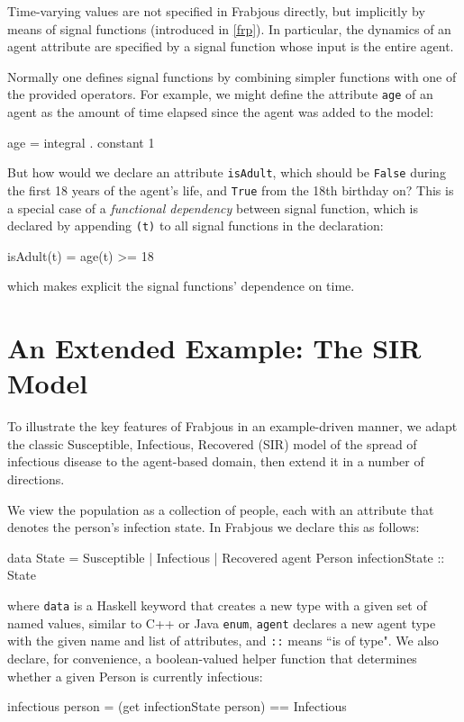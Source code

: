 \documentclass[oribibl]{llncs}
\begin{document}
Time-varying values are not specified in Frabjous directly, but implicitly by means of signal functions (introduced in \ref{frp}). In particular, the dynamics of an agent attribute are specified by a signal function whose input is the entire agent.

   Normally one defines signal functions by combining simpler functions with one of the provided operators. For example, we might define the attribute \lstinline{age} of an agent as the amount of time elapsed since the agent was added to the model:
\begin{code}
	age = integral . constant 1
\end{code}


   But how would we declare an attribute \lstinline{isAdult}, which should be  \lstinline{False} during the first 18 years of the agent's life, and  \lstinline{True} from the 18th birthday on? This is a special case of a \emph{functional dependency} between signal function, which is declared by appending \lstinline{(t)} to all signal functions in the declaration:
\begin{code}
	isAdult(t) = age(t) >= 18
\end{code}
which makes explicit the signal functions' dependence on time.

\section{An Extended Example: The SIR Model}
To illustrate the key features of Frabjous in an example-driven manner, we adapt the classic Susceptible, Infectious, Recovered (SIR) model of the spread of infectious disease to the agent-based domain, then extend it in a number of directions.

 We view the population as a collection of people, each with an attribute that denotes the person's infection state. In Frabjous we declare this as follows: 
\begin{code}
	data State = Susceptible | Infectious | Recovered 
	agent Person { infectionState :: State} 
\end{code}
where \lstinline{data} is a Haskell keyword that creates a new type with a given set of named values, similar to C++ or Java \lstinline{enum}, \lstinline{agent} declares a new agent type with the given name and list of attributes, and \lstinline{::} means ``is of type".  We also declare, for convenience, a boolean-valued helper function that determines whether a given Person is currently infectious: 
\begin{code}
	infectious person = (get infectionState person) == Infectious
\end{code}
\end{document}
